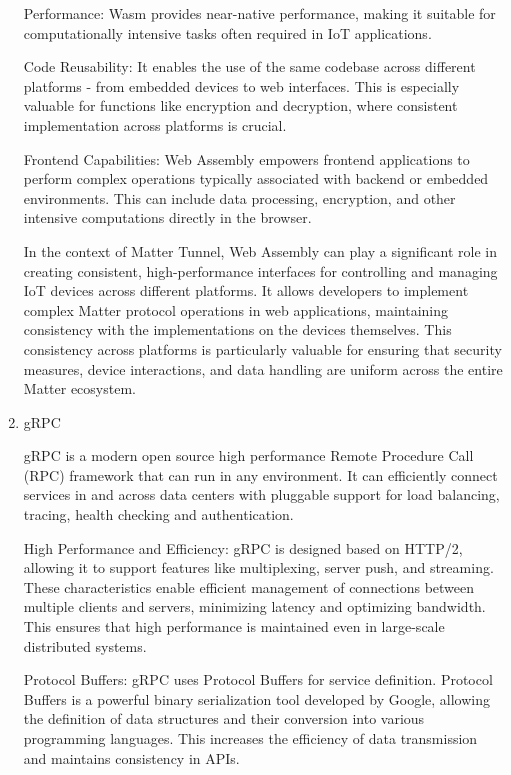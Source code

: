 \documentclass[conference]{IEEEtran}
\begin{document}
\begin{enumerate}[itemsep=2ex, parsep=1ex]
			Performance: Wasm provides near-native performance, making it suitable for
			computationally intensive tasks often required in IoT applications.

			Code Reusability: It enables the use of the same codebase across different
			platforms - from embedded devices to web interfaces. This is especially valuable
			for functions like encryption and decryption, where consistent
			implementation across platforms is crucial.

			Frontend Capabilities: Web Assembly empowers frontend applications to perform
			complex operations typically associated with backend or embedded environments.
			This can include data processing, encryption, and other intensive
			computations directly in the browser.

			In the context of Matter Tunnel, Web Assembly can play a significant role in
			creating consistent, high-performance interfaces for controlling and
			managing IoT devices across different platforms. It allows developers to implement
			complex Matter protocol operations in web applications, maintaining
			consistency with the implementations on the devices themselves. This consistency
			across platforms is particularly valuable for ensuring that security measures,
			device interactions, and data handling are uniform across the entire Matter
			ecosystem.

		\item gRPC

			gRPC is a modern open source high performance Remote Procedure Call (RPC)
			framework that can run in any environment. It can efficiently connect services
			in and across data centers with pluggable support for load balancing,
			tracing, health checking and authentication.

			High Performance and Efficiency: gRPC is designed based on HTTP/2, allowing
			it to support features like multiplexing, server push, and streaming.
			These characteristics enable efficient management of connections between
			multiple clients and servers, minimizing latency and optimizing bandwidth.
			This ensures that high performance is maintained even in large-scale
			distributed systems.

			Protocol Buffers: gRPC uses Protocol Buffers for service definition.
			Protocol Buffers is a powerful binary serialization tool developed by
			Google, allowing the definition of data structures and their conversion into
			various programming languages. This increases the efficiency of data
			transmission and maintains consistency in APIs.


\end{enumerate}
\end{document}
